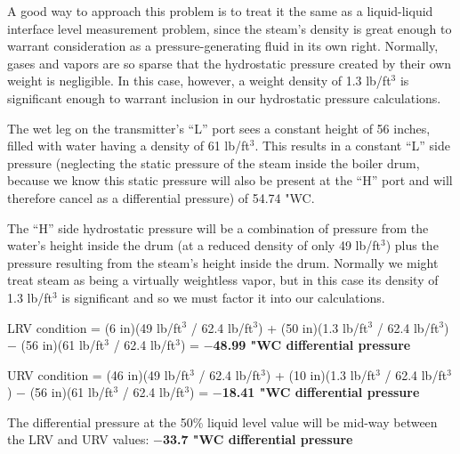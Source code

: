 





A good way to approach this problem is to treat it the same as a liquid-liquid interface level measurement problem, since the steam's density is great enough to warrant consideration as a pressure-generating fluid in its own right.  Normally, gases and vapors are so sparse that the hydrostatic pressure created by their own weight is negligible.  In this case, however, a weight density of 1.3 lb/ft$^{3}$ is significant enough to warrant inclusion in our hydrostatic pressure calculations.

\vskip 10pt

The wet leg on the transmitter's ``L'' port sees a constant height of 56 inches, filled with water having a density of 61 lb/ft$^{3}$.  This results in a constant ``L'' side pressure (neglecting the static pressure of the steam inside the boiler drum, because we know this static pressure will also be present at the ``H'' port and will therefore cancel as a differential pressure) of 54.74 "WC.

\vskip 10pt

The ``H'' side hydrostatic pressure will be a combination of pressure from the water's height inside the drum (at a reduced density of only 49 lb/ft$^{3}$) plus the pressure resulting from the steam's height inside the drum.  Normally we might treat steam as being a virtually weightless vapor, but in this case its density of 1.3 lb/ft$^{3}$ is significant and so we must factor it into our calculations.

\vskip 20pt

LRV condition = (6 in)(49 lb/ft$^{3}$ / 62.4 lb/ft$^{3}$) + (50 in)(1.3 lb/ft$^{3}$ / 62.4 lb/ft$^{3}$) $-$ (56 in)(61 lb/ft$^{3}$ / 62.4 lb/ft$^{3}$) = {\bf $-$48.99 "WC differential pressure}

\vskip 20pt

URV condition = (46 in)(49 lb/ft$^{3}$ / 62.4 lb/ft$^{3}$) + (10 in)(1.3 lb/ft$^{3}$ / 62.4 lb/ft$^{3}$) $-$ (56 in)(61 lb/ft$^{3}$ / 62.4 lb/ft$^{3}$) = {\bf $-$18.41 "WC differential pressure}

\vskip 20pt

The differential pressure at the 50\% liquid level value will be mid-way between the LRV and URV values: {\bf $-$33.7 "WC differential pressure}





